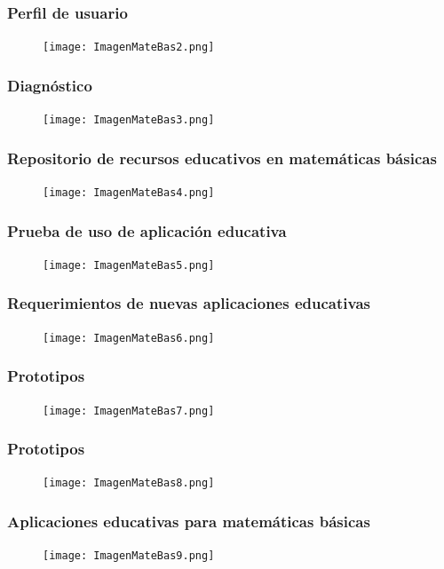 \documentclass[11pt]{beamer}
\begin{document}
\begin{frame}
\frametitle{Perfil de usuario}
    \begin{figure}
    \centering
     \texttt{[image: ImagenMateBas2.png]}
    \end{figure}
\end{frame}

\begin{frame}
\frametitle{Diagnóstico}
    \begin{figure}
    \centering
     \texttt{[image: ImagenMateBas3.png]}
    \end{figure}
\end{frame}

\begin{frame}
\frametitle{Repositorio de recursos educativos en matemáticas básicas}
    \begin{figure}
    \centering
     \texttt{[image: ImagenMateBas4.png]}
    \end{figure}
\end{frame}

\begin{frame}
\frametitle{Prueba de uso de aplicación educativa}
    \begin{figure}
    \centering
     \texttt{[image: ImagenMateBas5.png]}
    \end{figure}
\end{frame}

\begin{frame}
\frametitle{Requerimientos de nuevas aplicaciones educativas}
    \begin{figure}
    \centering
     \texttt{[image: ImagenMateBas6.png]}
    \end{figure}
\end{frame}

\begin{frame}
\frametitle{Prototipos}
    \begin{figure}
    \centering
     \texttt{[image: ImagenMateBas7.png]}
    \end{figure}
\end{frame}

\begin{frame}
\frametitle{Prototipos}
    \begin{figure}
    \centering
     \texttt{[image: ImagenMateBas8.png]}
    \end{figure}
\end{frame}

\begin{frame}
\frametitle{Aplicaciones educativas para matemáticas básicas}
    \begin{figure}
    \centering
     \texttt{[image: ImagenMateBas9.png]}
    \end{figure}
\end{frame}
\end{document}

